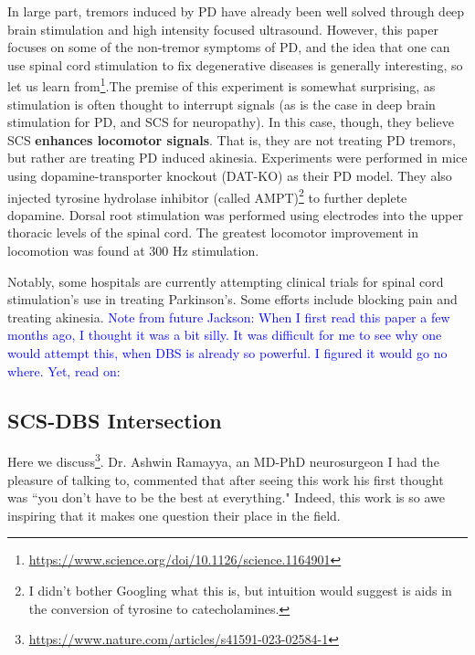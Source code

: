 In large part, tremors induced by PD have already been well solved through deep brain stimulation and high intensity focused ultrasound. However, this paper focuses on some of the non-tremor symptoms of PD, and the idea that one can use spinal cord stimulation to fix degenerative diseases is generally interesting, so let us learn from\footnote{\url{https://www.science.org/doi/10.1126/science.1164901}}.The premise of this experiment is somewhat surprising, as stimulation is often thought to interrupt signals (as is the case in deep brain stimulation for PD, and SCS for neuropathy). In this case, though, they believe SCS \textbf{enhances locomotor signals}. That is, they are not treating PD tremors, but rather are treating PD induced akinesia. Experiments were performed in mice using dopamine-transporter knockout (DAT-KO) as their PD model. They also injected tyrosine hydrolase inhibitor (called AMPT)\footnote{I didn't bother Googling what this is, but intuition would suggest is aids in the conversion of tyrosine to catecholamines.} to further deplete dopamine. Dorsal root stimulation was performed using electrodes into the upper thoracic levels of the spinal cord. The greatest locomotor improvement in locomotion was found at 300 Hz stimulation.\newline

Notably, some hospitals are currently attempting clinical trials for spinal cord stimulation's use in treating Parkinson's. Some efforts include blocking pain and treating akinesia. \textcolor{blue}{Note from future Jackson: When I first read this paper a few months ago, I thought it was a bit silly. It was difficult for me to see why one would attempt this, when DBS is already so powerful. I figured it would go no where. Yet, read on:}

\subsection{SCS-DBS Intersection}

Here we discuss\footnote{\url{https://www.nature.com/articles/s41591-023-02584-1}}. Dr. Ashwin Ramayya, an MD-PhD neurosurgeon I had the pleasure of talking to, commented that after seeing this work his first thought was ``you don't have to be the best at everything." Indeed, this work is so awe inspiring that it makes one question their place in the field.\newline

